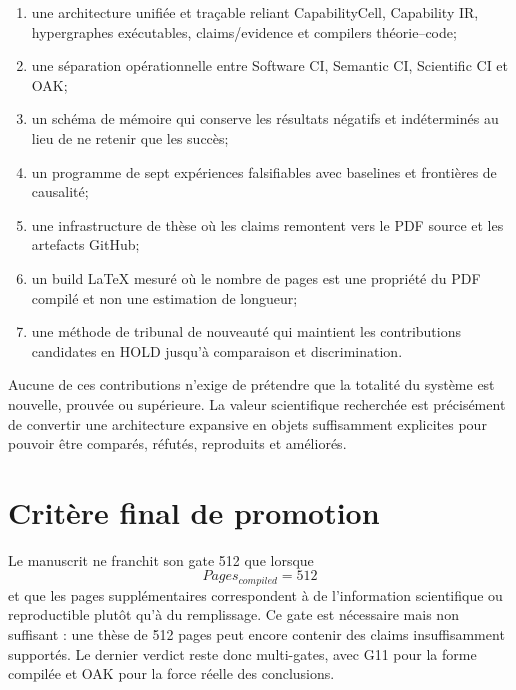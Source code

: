 \begin{enumerate}
  \item une architecture unifiée et traçable reliant CapabilityCell, Capability IR, hypergraphes exécutables, claims/evidence et compilers théorie--code;
  \item une séparation opérationnelle entre Software CI, Semantic CI, Scientific CI et OAK;
  \item un schéma de mémoire qui conserve les résultats négatifs et indéterminés au lieu de ne retenir que les succès;
  \item un programme de sept expériences falsifiables avec baselines et frontières de causalité;
  \item une infrastructure de thèse où les claims remontent vers le PDF source et les artefacts GitHub;
  \item un build LaTeX mesuré où le nombre de pages est une propriété du PDF compilé et non une estimation de longueur;
  \item une méthode de tribunal de nouveauté qui maintient les contributions candidates en HOLD jusqu'à comparaison et discrimination.
\end{enumerate}

Aucune de ces contributions n'exige de prétendre que la totalité du système est nouvelle, prouvée ou supérieure. La valeur scientifique recherchée est précisément de convertir une architecture expansive en objets suffisamment explicites pour pouvoir être comparés, réfutés, reproduits et améliorés.

\section{Critère final de promotion}

Le manuscrit ne franchit son gate 512 que lorsque
\[
Pages_{compiled}=512
\]
et que les pages supplémentaires correspondent à de l'information scientifique ou reproductible plutôt qu'à du remplissage. Ce gate est nécessaire mais non suffisant : une thèse de 512 pages peut encore contenir des claims insuffisamment supportés. Le dernier verdict reste donc multi-gates, avec G11 pour la forme compilée et OAK pour la force réelle des conclusions.
